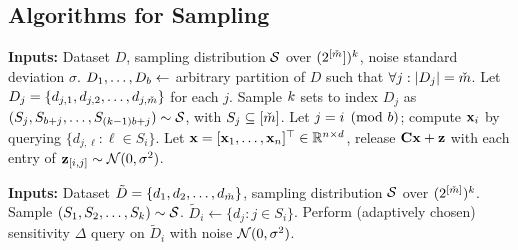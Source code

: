 \documentclass{article}
\begin{document}
\subsection{Algorithms for Sampling}\label{sec:amplification-algorithms}
\begin{algorithm}[H]
\caption{Sampling scheme for banded DP-MF} \label{alg:amplified-dpmf}
\begin{algorithmic}%
\State \textbf{Inputs:} Dataset $D$, sampling distribution $\mathcal{S}$ over $(2^{[\check{m}}])^{k}$, noise standard deviation $\sigma$.
\State $D_1, \ldots, D_{b} \leftarrow$ arbitrary partition of $D$ such that $\forall j: |D_j|  = \check{m} $.
\State Let $D_j = \{d_{j,1}, d_{j,2}, \ldots, d_{j,\check{m}}\}$ for each $j$. 
  \State Sample $k$ sets to index $D_j$ as $(S_j, S_{b+j}, \ldots, S_{(k - 1)b + j}) \sim \mathcal{S}$, with $S_j \subseteq [\check{m}]$.
\EndFor
{}
\State Let $j = i \pmod {b}$; compute $\mathbf{x}_i$ by querying $\{d_{j,\ell}: \ell \in S_i\}$.
\EndFor
\State Let $\mathbf{x} = [\mathbf{x}_1, \dots, \mathbf{x}_n]^\top \in \mathbb{R}^{n \times d}$, release $\mathbf{C} \mathbf{x} + \mathbf{z}$ with each entry of $\mathbf{z}_{[i, j]} \sim \mathcal{N}(0, \sigma^2)$.
\end{algorithmic}
\end{algorithm}

\begin{algorithm}[H]
\caption{Sequence of queries that bounds privacy of \cref{alg:amplified-dpmf}} \label{alg:queryub}
\begin{algorithmic}%
\State \textbf{Inputs:} Dataset $\tilde{D} = \{d_1, d_2, \ldots, d_{\check{m}}\}$, sampling distribution $\mathcal{S}$ over $(2^{[\check{m}]})^{k}$.
\State Sample $(S_1, S_2, \ldots, S_{k}) \sim \mathcal{S}$.
\State $\tilde{D}_i \leftarrow \{d_j: j \in S_i\}$.
\State Perform (adaptively chosen) sensitivity $\Delta$ query on $\tilde{D}_i$ with noise $\mathcal{N}(0, \sigma^2)$.
\EndFor
\end{algorithmic}
\end{algorithm}
\end{document}
